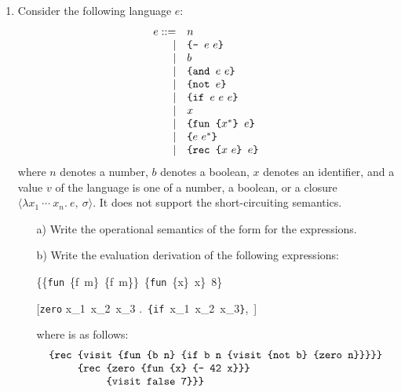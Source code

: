 \begin{enumerate}
\item Consider the following language $e$:
\[
\begin{array}{rll}
e ::= & n\\
\mid& \verb!{- ! e\ e\verb+}+\\
\mid& b\\
\mid& \verb!{and ! e\ e\verb+}+\\
\mid& \verb!{not ! e\verb+}+\\
\mid& \verb!{if ! e\ e\ e\verb+}+\\
\mid& x\\
\mid& \verb!{fun {! x^*\verb+} +e\verb+}+\\
\mid& \verb!{! e\ e^*\verb+}+\\
\mid& \verb!{rec {! x\ e\verb+} +e\verb+}+\\
\end{array}
\]
where $n$ denotes a number, $b$ denotes a boolean, $x$ denotes an identifier,
and a value $v$ of the language is one of a number, a boolean, or a closure
$\langle \lambda x_1\ \cdots\ x_n .\ e,\ \sigma\rangle$.
It does not support the short-circuiting semantics.
\begin{itemize}
  \item[a)]
Write the operational semantics of the form  for the expressions.
  \item[b)] Write the evaluation derivation of the following expressions:

\hspace*{-5em}
\derive {\hspace*{\textwidth}}
{\emptyset\vdash \{\{\texttt{fun}\ \{f\ m\}\ \{f\ m\}\}\
\{\texttt{fun}\ \{x\}\ x\}\ 8\} \Rightarrow~~~~~~~~}

\hspace*{-5em}
\derive
{\hspace*{\textwidth}}
{[\texttt{zero} \mapsto \langle 
\lambda x_1\ x_2\ x_3 .\ 
\texttt{\{if}\ x_1\ x_2\ x_3\texttt{\}},\
\emptyset\rangle] \vdash {}
\Rightarrow~~~~~~~~
}

\bigskip
where  is as follows:
\[
\begin{array}{l}
\texttt{\{rec \{visit \{fun \{b\ n\} \{if b n \{visit \{not b\} \{zero n\}\}\}\}\}}\\
\texttt{\phantom{\{rec }\{rec \{zero \{fun \{x\} \{- 42 x\}\}\}}\\
\texttt{\phantom{\{rec \{rec }\{visit false 7\}\}\}}
\end{array}
\]


\end{itemize}
\end{enumerate}
